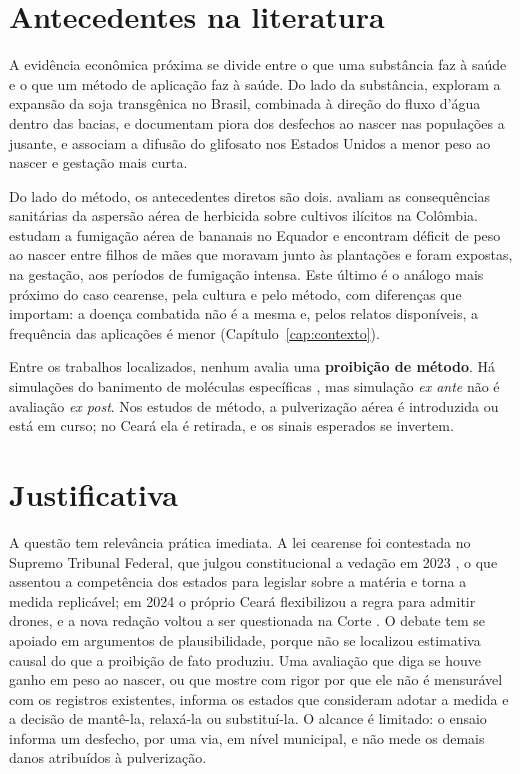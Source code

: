 \section{Antecedentes na literatura}

A evidência econômica próxima se divide entre o que uma substância faz à saúde
e o que um método de aplicação faz à saúde. Do lado da substância,
 exploram a expansão da soja transgênica no Brasil,
combinada à direção do fluxo d'água dentro das bacias, e documentam piora dos
desfechos ao nascer nas populações a jusante, e
 associam a difusão do glifosato nos Estados
Unidos a menor peso ao nascer e gestação mais curta.

Do lado do método, os antecedentes diretos são dois.
 avaliam as consequências sanitárias da aspersão
aérea de herbicida sobre cultivos ilícitos na Colômbia.
 estudam a fumigação aérea de bananais no
Equador e encontram déficit de peso ao nascer entre filhos de mães que moravam
junto às plantações e foram expostas, na gestação, aos períodos de fumigação
intensa. Este último é o análogo mais próximo do caso cearense, pela cultura e
pelo método, com diferenças que importam: a doença combatida não é a mesma e,
pelos relatos disponíveis, a frequência das aplicações é menor
(Capítulo~\ref{cap:contexto}).

Entre os trabalhos localizados, nenhum avalia uma \textbf{proibição de
método}. Há simulações do banimento de moléculas específicas
\cite{bocker2020glyphosate}, mas simulação \emph{ex ante} não é avaliação
\emph{ex post}. Nos estudos de método, a pulverização aérea é introduzida ou
está em curso; no Ceará ela é retirada, e os sinais esperados se invertem.

\section{Justificativa}

A questão tem relevância prática imediata. A lei cearense foi contestada no
Supremo Tribunal Federal, que julgou constitucional a vedação em 2023
\cite{stf2023adi6137}, o que assentou a competência dos estados para legislar
sobre a matéria e torna a medida replicável; em 2024 o próprio Ceará
flexibilizou a regra para admitir drones, e a nova redação voltou a ser
questionada na Corte \cite{stf2025adi7794}. O debate tem se apoiado em
argumentos de plausibilidade, porque não se localizou estimativa causal do que
a proibição de fato produziu. Uma avaliação que diga se houve ganho em peso ao
nascer, ou que mostre com rigor por que ele não é mensurável com os registros
existentes, informa os estados que consideram adotar a medida e a decisão de
mantê-la, relaxá-la ou substituí-la. O alcance é limitado: o ensaio informa um
desfecho, por uma via, em nível municipal, e não mede os demais danos
atribuídos à pulverização.

